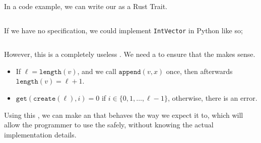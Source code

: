 In a code example, we can write our  as a Rust Trait.
\inputminted[frame=lines,linenos]{rust}{./EDAP05-Concepts_Programming_Languages-Sections/Abstract_Data_Types/Code/IntVector_Interface.rs}

If we have no specification, we could implement \texttt{IntVector} in Python like so;
\inputminted[frame=lines,linenos]{python3}{./EDAP05-Concepts_Programming_Languages-Sections/Abstract_Data_Types/Code/IntVector_No_Spec.py}

However, this is a completely useless .
We need a  to ensure that the  makes sense.
\begin{itemize}[noitemsep]
\item If $\ell = \mathtt{length}(v)$, and we call $\mathtt{append}(v, x)$ once, then afterwards $\mathtt{length}(v) = \ell + 1$.
\item $\mathtt{get}(\mathtt{create}(\ell), i) = 0$ if $i \in \lbrace 0, 1, \ldots, \ell-1 \rbrace$, otherwise, there is an error.
\end{itemize}

Using this , we can make an  that behaves the way we expect it to, which will allow the programmer to use the  safely, without knowing the actual implementation details.


